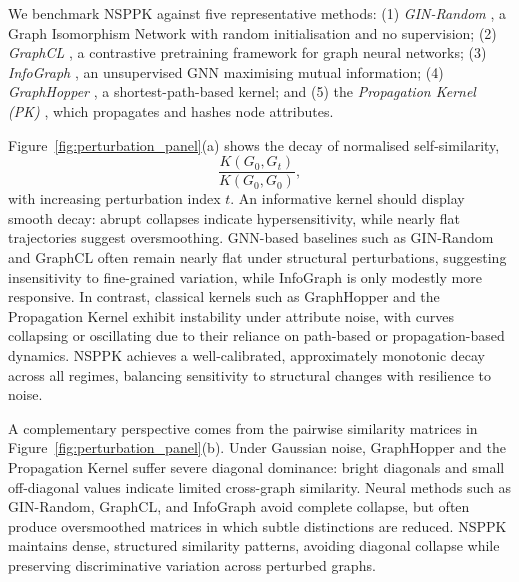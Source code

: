 We benchmark NSPPK against five representative methods:
(1) \emph{GIN-Random} \citep{xu2019powerful}, a Graph Isomorphism Network with
random initialisation and no supervision;
(2) \emph{GraphCL} \citep{you2020graph}, a contrastive pretraining framework for
graph neural networks;
(3) \emph{InfoGraph} \citep{sun2019infograph}, an unsupervised GNN maximising
mutual information;
(4) \emph{GraphHopper} \citep{feragen2013scalable}, a shortest-path-based
kernel; and
(5) the \emph{Propagation Kernel (PK)} \citep{neumann2016propagation}, which
propagates and hashes node attributes.

Figure~\ref{fig:perturbation_panel}(a) shows the decay of normalised
self-similarity,
\[
\frac{K(G_0,G_t)}{K(G_0,G_0)},
\]
with increasing perturbation index $t$. An informative kernel should display
smooth decay: abrupt collapses indicate hypersensitivity, while nearly flat
trajectories suggest oversmoothing. GNN-based baselines such as GIN-Random and
GraphCL often remain nearly flat under structural perturbations, suggesting
insensitivity to fine-grained variation, while InfoGraph is only modestly more
responsive. In contrast, classical kernels such as GraphHopper and the
Propagation Kernel exhibit instability under attribute noise, with curves
collapsing or oscillating due to their reliance on path-based or propagation-based
dynamics. NSPPK achieves a well-calibrated, approximately monotonic decay across
all regimes, balancing sensitivity to structural changes with resilience to noise.

A complementary perspective comes from the pairwise similarity matrices in
Figure~\ref{fig:perturbation_panel}(b). Under Gaussian noise, GraphHopper and
the Propagation Kernel suffer severe diagonal dominance: bright diagonals and
small off-diagonal values indicate limited cross-graph similarity. Neural methods
such as GIN-Random, GraphCL, and InfoGraph avoid complete collapse, but often
produce oversmoothed matrices in which subtle distinctions are reduced. NSPPK
maintains dense, structured similarity patterns, avoiding diagonal collapse while
preserving discriminative variation across perturbed graphs.

